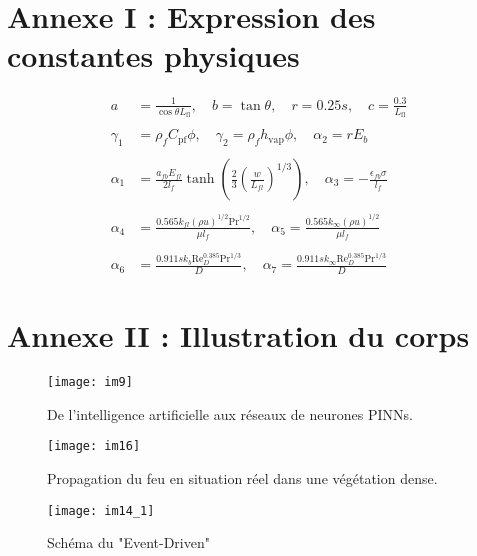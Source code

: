 \documentclass[12pt, oneside]{report} %
\theoremstyle{definition}
\theoremstyle{remark}
\begin{document}
	\chapter*{Annexe I : Expression des constantes physiques}
	\label{chp:annexe I}
	\begin{align*}
		a &= \frac{1}{\cos\theta L_{\text{fl}}}, \quad b=\tan\theta, \quad r=0.25s, \quad c=\frac{0.3}{L_{\text{fl}}} \\ 
		\\
		\gamma_1& = \rho_f C_{\text{pf}} \phi, \quad \gamma_2 = \rho_f h_{\text{vap}} \phi,  \quad \alpha_2 = rE_b\\
		\\
		\alpha_1 &= \frac{a_{fb}E_{fl}}{2l_f}\tanh\left(\frac{2}{3}\left(\frac{w}{L_{fl}}\right)^{1/3}\right) , \quad \alpha_3 = -\frac{\epsilon_{fb}\sigma}{l_f} \\
		\\
		\alpha_4 &= \frac{0.565k_{fl}(\rho u)^{1/2}\mathrm{Pr}^{1/2}}{\mu l_f}, \quad \alpha_5 = \frac{0.565k_\infty(\rho u)^{1/2}}{\mu l_f} \\
		\\
		\alpha_6 &= \frac{0.911sk_b\mathrm{Re}_D^{0.385}\mathrm{Pr}^{1/3}}{D}, \quad \alpha_7 = \frac{0.911sk_\infty\mathrm{Re}_D^{0.385}\mathrm{Pr}^{1/3}}{D}
	\end{align*}
	

	\chapter*{Annexe II : Illustration du corps}
	\label{chp:annexe II}
	
	\begin{figure}[h]
		\centering
		\texttt{[image: im9]}
		\caption{De l'intelligence artificielle aux réseaux de neurones PINNs.}
		\label{fig:im9}
	\end{figure}
		\begin{figure}[h]
	\centering
	\texttt{[image: im16]}
	\caption{Propagation du feu en situation réel dans une végétation dense.}
	\label{fig:im16}
\end{figure}
	\begin{figure}[h]
		\centering
		\texttt{[image: im14\_1]}
		\caption{Schéma du "Event-Driven"}
		\label{fig:im141}
	\end{figure}
\end{document}
